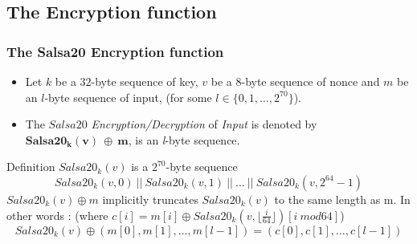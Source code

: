 \subsection{The Encryption function}
\begin{frame}
\frametitle{The Salsa20 Encryption function}

\begin{exampleblock}{}
\begin{itemize}
    \item Let $k$ be a $32$-byte sequence of key, $v$ be a $8$-byte sequence of nonce and $m$ be an $\textit{l}$-byte sequence of input, (for some $\textit{l} \in \{0,1,\ldots, 2^{70} \}$).
    \item The $Salsa20$ \textit{Encryption/Decryption} of \textit{Input} is denoted by $\mathbf{Salsa20_k(v) \ \oplus \ m}$, is an \textit{l}-byte sequence.
\end{itemize}
\end{exampleblock}
\begin{block}{Definition}
$Salsa20_k(v)$ is a $2^{70}$-byte sequence
\vspace{-5pt}
$$Salsa20_k(v,0) \ || \ Salsa20_k(v,1) \ || \ \ldots \ || \ Salsa20_k(v,2^{64}- 1)$$
$Salsa20_k(v)\oplus m$ implicitly truncates $Salsa20_k(v)$ to the same length as m. In other words : \small{(where $ c[i] = m[i] \oplus Salsa20_k(v, \lfloor\frac{i}{64}\rfloor)[i~ mod 64]$)}
\vspace{-5pt}
  $$Salsa20_k(v) \oplus (m[0],m[1],\ldots,m[l-1]) = (c[0], c[1],\ldots, c[l-1])$$  
\end{block}

\end{frame}